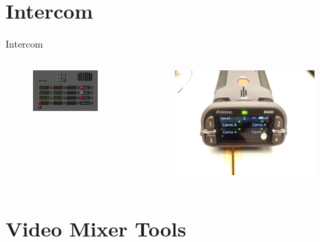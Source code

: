\documentclass[aspectratio=169]{beamer}
\begin{document}
\section{Intercom} 
 \begin{frame}{Intercom}
	\begin{columns}[T,onlytextwidth]
		\begin{figure} 
		\centering
		\def\svgwidth{1\textwidth}
		\includegraphics[width=0.9\textwidth]{images/intercom.png} 
		\end{figure}
	\begin{figure} 
		\centering
		\def\svgwidth{1\textwidth}
		\includegraphics[width=0.93\textwidth]{images/bolero.jpg} 
	\end{figure}
	\end{columns}
\end{frame}

\section{Video Mixer Tools}
\end{document}
